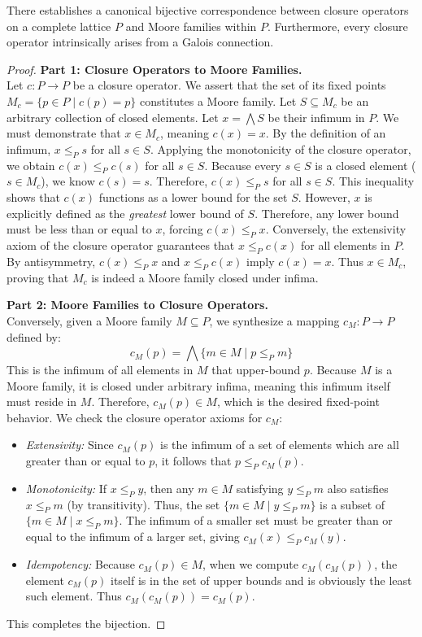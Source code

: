 \begin{theorem}
There establishes a canonical bijective correspondence between closure operators on a complete lattice $P$ and Moore families within $P$. Furthermore, every closure operator intrinsically arises from a Galois connection.
\end{theorem}
\begin{proof}
\textbf{Part 1: Closure Operators to Moore Families.} \\
Let $c: P \to P$ be a closure operator. We assert that the set of its fixed points $M_c = \{ p \in P \mid c(p) = p \}$ constitutes a Moore family.
Let $S \subseteq M_c$ be an arbitrary collection of closed elements. Let $x = \bigwedge S$ be their infimum in $P$. We must demonstrate that $x \in M_c$, meaning $c(x) = x$.
By the definition of an infimum, $x \leq_P s$ for all $s \in S$. Applying the monotonicity of the closure operator, we obtain $c(x) \leq_P c(s)$ for all $s \in S$. Because every $s \in S$ is a closed element ($s \in M_c$), we know $c(s) = s$. Therefore, $c(x) \leq_P s$ for all $s \in S$.
This inequality shows that $c(x)$ functions as a lower bound for the set $S$. However, $x$ is explicitly defined as the \emph{greatest} lower bound of $S$. Therefore, any lower bound must be less than or equal to $x$, forcing $c(x) \leq_P x$.
Conversely, the extensivity axiom of the closure operator guarantees that $x \leq_P c(x)$ for all elements in $P$.
By antisymmetry, $c(x) \leq_P x$ and $x \leq_P c(x)$ imply $c(x) = x$. Thus $x \in M_c$, proving that $M_c$ is indeed a Moore family closed under infima.

\textbf{Part 2: Moore Families to Closure Operators.} \\
Conversely, given a Moore family $M \subseteq P$, we synthesize a mapping $c_M: P \to P$ defined by:
\[ c_M(p) = \bigwedge \{ m \in M \mid p \leq_P m \} \]
This is the infimum of all elements in $M$ that upper-bound $p$. Because $M$ is a Moore family, it is closed under arbitrary infima, meaning this infimum itself must reside in $M$. Therefore, $c_M(p) \in M$, which is the desired fixed-point behavior. 
We check the closure operator axioms for $c_M$:
\begin{itemize}
    \item \emph{Extensivity:} Since $c_M(p)$ is the infimum of a set of elements which are all greater than or equal to $p$, it follows that $p \leq_P c_M(p)$.
    \item \emph{Monotonicity:} If $x \leq_P y$, then any $m \in M$ satisfying $y \leq_P m$ also satisfies $x \leq_P m$ (by transitivity). Thus, the set $\{m \in M \mid y \leq_P m\}$ is a subset of $\{m \in M \mid x \leq_P m\}$. The infimum of a smaller set must be greater than or equal to the infimum of a larger set, giving $c_M(x) \leq_P c_M(y)$.
    \item \emph{Idempotency:} Because $c_M(p) \in M$, when we compute $c_M(c_M(p))$, the element $c_M(p)$ itself is in the set of upper bounds and is obviously the least such element. Thus $c_M(c_M(p)) = c_M(p)$.
\end{itemize}
This completes the bijection.


\end{proof}
